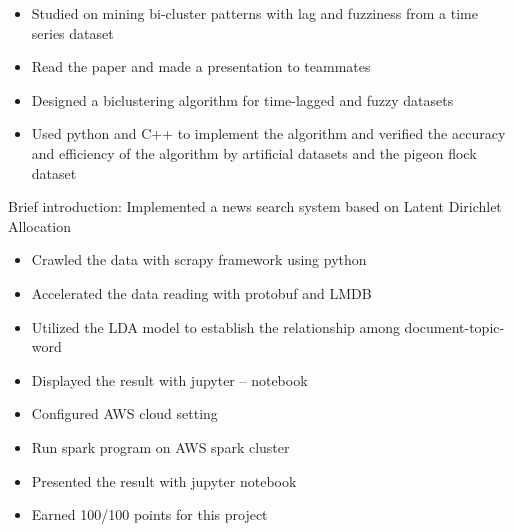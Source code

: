 \documentclass{resume}
\begin{document}
\begin{itemize}
  \item Studied on mining bi-cluster patterns with lag and fuzziness from a time series dataset
  \item Read the paper and made a presentation to teammates 
  \item Designed a biclustering algorithm for time-lagged and fuzzy datasets
  \item Used python and C++ to implement the algorithm and verified the accuracy and efficiency of the algorithm by artificial datasets and the pigeon flock dataset 
\end{itemize}

Brief introduction: Implemented a news search system based on Latent Dirichlet Allocation
\begin{itemize}
  \item Crawled the data with scrapy framework using python 
  \item Accelerated the data reading with protobuf and LMDB 
  \item Utilized the LDA model to establish the relationship among document-topic-word 
  \item Displayed the result with jupyter – notebook 
\end{itemize}

\begin{itemize}
  \item Configured AWS cloud setting
  \item Run spark program on AWS spark cluster 
  \item Presented the result with jupyter notebook
  \item Earned 100/100 points for this project
\end{itemize}

\end{document}
